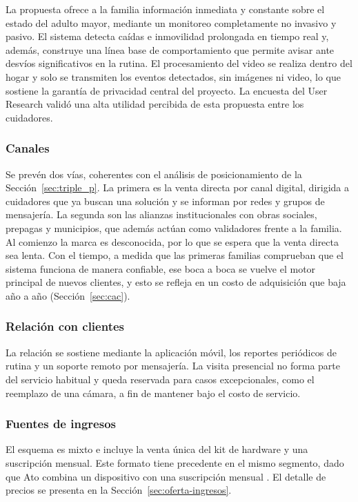 La propuesta ofrece a la familia información inmediata y constante sobre el estado del adulto mayor, mediante un monitoreo completamente no invasivo y pasivo.
El sistema detecta caídas e inmovilidad prolongada en tiempo real y, además, construye una línea base de comportamiento que permite avisar ante desvíos significativos en la rutina.
El procesamiento del video se realiza dentro del hogar y solo se transmiten los eventos detectados, sin imágenes ni video, lo que sostiene la garantía de privacidad central del proyecto.
La encuesta del User Research validó una alta utilidad percibida de esta propuesta entre los cuidadores.

\subsubsection{Canales}

Se prevén dos vías, coherentes con el análisis de posicionamiento de la Sección~\ref{sec:triple_p}.
La primera es la venta directa por canal digital, dirigida a cuidadores que ya buscan una solución y se informan por redes y grupos de mensajería.
La segunda son las alianzas institucionales con obras sociales, prepagas y municipios, que además actúan como validadores frente a la familia.
Al comienzo la marca es desconocida, por lo que se espera que la venta directa sea lenta.
Con el tiempo, a medida que las primeras familias comprueban que el sistema funciona de manera confiable, ese boca a boca se vuelve el motor principal de nuevos clientes, y esto se refleja en un costo de adquisición que baja año a año (Sección~\ref{sec:cac}).

\subsubsection{Relación con clientes}

La relación se sostiene mediante la aplicación móvil, los reportes periódicos de rutina y un soporte remoto por mensajería.
La visita presencial no forma parte del servicio habitual y queda reservada para casos excepcionales, como el reemplazo de una cámara, a fin de mantener bajo el costo de servicio.

\subsubsection{Fuentes de ingresos}

El esquema es mixto e incluye la venta única del kit de hardware y una suscripción mensual.
Este formato tiene precedente en el mismo segmento, dado que Ato combina un dispositivo con una suscripción mensual \parencite{Ato}.
El detalle de precios se presenta en la Sección~\ref{sec:oferta-ingresos}.

